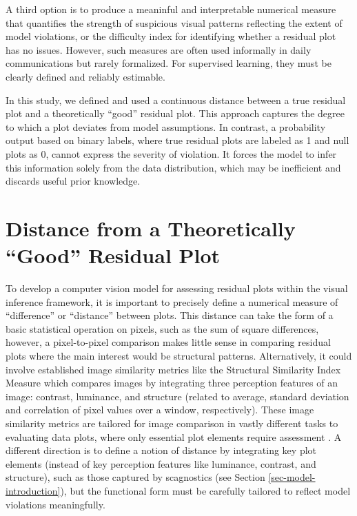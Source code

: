 \documentclass[]{interact}
\theoremstyle{plain}%
\theoremstyle{definition}
\theoremstyle{remark}
\begin{document}
A third option is to produce a meaninful and interpretable numerical
measure that quantifies the strength of suspicious visual patterns
reflecting the extent of model violations, or the difficulty index for
identifying whether a residual plot has no issues. However, such
measures are often used informally in daily communications but rarely
formalized. For supervised learning, they must be clearly defined and
reliably estimable.

In this study, we defined and used a continuous distance between a true
residual plot and a theoretically ``good'' residual plot. This approach
captures the degree to which a plot deviates from model assumptions. In
contrast, a probability output based on binary labels, where true
residual plots are labeled as 1 and null plots as 0, cannot express the
severity of violation. It forces the model to infer this information
solely from the data distribution, which may be inefficient and discards
useful prior knowledge.

\section{Distance from a Theoretically ``Good'' Residual
Plot}\label{sec-model-distance-between-residual-plots}

To develop a computer vision model for assessing residual plots within
the visual inference framework, it is important to precisely define a
numerical measure of ``difference'' or ``distance'' between plots. This
distance can take the form of a basic statistical operation on pixels,
such as the sum of square differences, however, a pixel-to-pixel
comparison makes little sense in comparing residual plots where the main
interest would be structural patterns. Alternatively, it could involve
established image similarity metrics like the Structural Similarity
Index Measure \citep{wang2004image} which compares images by integrating
three perception features of an image: contrast, luminance, and
structure (related to average, standard deviation and correlation of
pixel values over a window, respectively). These image similarity
metrics are tailored for image comparison in vastly different tasks to
evaluating data plots, where only essential plot elements require
assessment \citep{chowdhury2018measuring}. A different direction is to
define a notion of distance by integrating key plot elements (instead of
key perception features like luminance, contrast, and structure), such
as those captured by scagnostics (see Section
\ref{sec-model-introduction}), but the functional form must be carefully
tailored to reflect model violations meaningfully.
\end{document}
